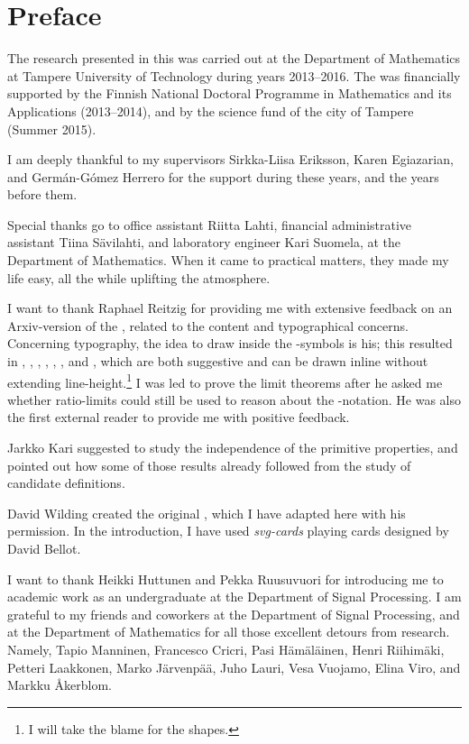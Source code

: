 \documentclass[b5paper, english, oneside]{memoir}
\begin{document}
\chapter{Preface}

The research presented in this \manuscript{} was carried out at the Department of Mathematics at Tampere University of Technology during years 2013--2016. The \manuscript{} was financially supported by the Finnish National Doctoral Programme in Mathematics and its Applications (2013--2014), and by the science fund of the city of Tampere (Summer 2015).

I am deeply thankful to my supervisors Sirkka-Liisa Eriksson, Karen Egiazarian, and Germán-Gómez Herrero for the support during these years, and the years before them. 

Special thanks go to office assistant Riitta Lahti, financial administrative assistant Tiina Sävilahti, and laboratory engineer Kari Suomela, at the Department of Mathematics. When it came to practical matters, they made my life easy, all the while uplifting the atmosphere.

I want to thank Raphael Reitzig for providing me with extensive feedback on an Arxiv-version of the \manuscript{}, related to the content and typographical concerns. Concerning typography, the idea to draw inside the -symbols is his; this resulted in , , , , , , and , which are both suggestive and can be drawn inline without extending line-height.\footnote{I will take the blame for the shapes.} I was led to prove the limit theorems after he asked me whether ratio-limits could still be used to reason about the -notation. He was also the first external reader to provide me with positive feedback.

Jarkko Kari suggested to study the independence of the primitive properties, and pointed out how some of those results already followed from the study of candidate definitions.

David Wilding created the original , which I have adapted here with his permission. In the introduction, I have used \emph{svg-cards} playing cards designed by David Bellot.

I want to thank Heikki Huttunen and Pekka Ruusuvuori for introducing me to academic work as an undergraduate at the Department of Signal Processing. I am grateful to my friends and coworkers at the Department of Signal Processing, and at the Department of Mathematics for all those excellent detours from research. Namely, Tapio Manninen, Francesco Cricri, Pasi Hämäläinen, Henri Riihimäki, Petteri Laakkonen, Marko Järvenpää, Juho Lauri, Vesa Vuojamo, Elina Viro, and Markku Åkerblom.
\end{document}
